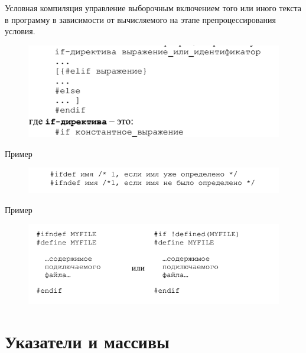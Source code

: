 \documentclass{beamer}
\begin{document}
\begin{frame}
\begin{block}{Условная компиляция}
управление выборочным включением того или иного текста в программу в зависимости от вычисляемого на этапе препроцессирования условия.
\end{block}
\begin{figure}[h]
\centering
\includegraphics[scale=0.5]{images/lec03-pic17.png}
\end{figure}
Пример
\begin{figure}[h]
\centering
\includegraphics[scale=0.5]{images/lec03-pic18.png}
\end{figure}
\end{frame}

\begin{frame}
Пример
\begin{figure}[h]
\centering
\includegraphics[scale=0.5]{images/lec03-pic19.png}
\end{figure}
\end{frame}

\section{Указатели и массивы}
\end{document}
